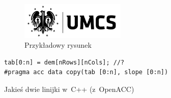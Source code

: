 \begin{figure}[b]
    \begin{center}
        \includegraphics[width=5cm]{fig/LogoUMCS}
    \end{center}
    \caption{Przykładowy rysunek}\label{rys:przyk}
\end{figure}

\begin{lstfloat}[b]
    \lstset{language=C++}
    \begin{lstlisting}[frame=single]
tab[0:n] = dem[nRows][nCols]; //?
#pragma acc data copy(tab [0:n], slope [0:n])
\end{lstlisting}
    \caption{Jakieś dwie linijki w~C++ (z~OpenACC)}\label{lst:przyk}
\end{lstfloat}
